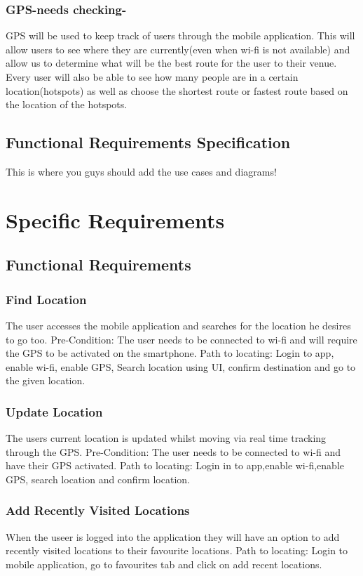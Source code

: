\documentclass{article}
\begin{document}
\subsubsection{GPS-needs checking-}
GPS will be used to keep track of users through the mobile application. This will allow users to see where they are currently(even when wi-fi is not available) and allow us to determine what will be the best route for the user to their venue. Every user will also be able to see how many people are in a certain location(hotspots) as well as choose the shortest route or fastest route based on the location of the hotspots.
\subsection {Functional Requirements Specification}
This is where you guys should add the use cases and diagrams!
\newpage
\centering
\section{Specific Requirements}
\subsection{Functional Requirements}
\subsubsection{Find Location}
The user accesses the mobile application and searches for the location he desires to go too. Pre-Condition: The user needs to be connected to wi-fi and will require the GPS to be activated on the smartphone. Path to locating: Login to app, enable wi-fi, enable GPS, Search location using UI, confirm destination and go to the given location.

\subsubsection{Update Location}
The users current location is updated whilst moving via real time tracking through the GPS. Pre-Condition: The user needs to be connected to wi-fi and have their GPS activated. Path to locating: Login in to app,enable wi-fi,enable GPS, search location and confirm location.

\subsubsection{Add Recently Visited Locations}
When the useer is logged into the application they will have an option to add recently visited locations to their favourite locations. Path to locating: Login to mobile application, go to favourites tab and click on add recent locations.
\end{document}
